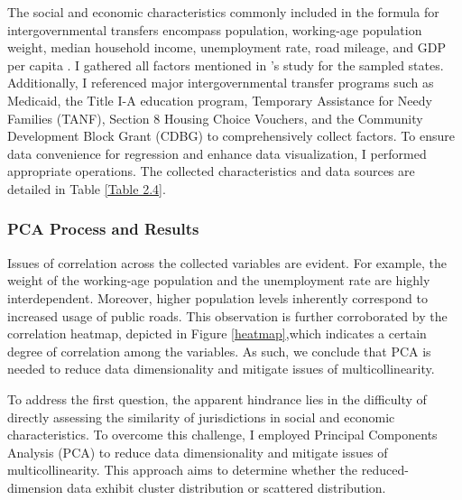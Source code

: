 The social and economic characteristics commonly included in the formula for intergovernmental transfers encompass population, working-age population weight, median household income, unemployment rate, road mileage, and GDP per capita \parencite{dilger2015federal}. I gathered all factors mentioned in \Textcite{dilger2015federal}'s study for the sampled states. Additionally, I referenced major intergovernmental transfer programs such as Medicaid, the Title I-A education program, Temporary Assistance for Needy Families (TANF), Section 8 Housing Choice Vouchers, and the Community Development Block Grant (CDBG) to comprehensively collect factors. To ensure data convenience for regression and enhance data visualization, I performed appropriate operations. The collected characteristics and data sources are detailed in Table \ref{Table 2.4}.%


\subsubsection{PCA Process and Results}

Issues of correlation across the collected variables are evident. For example, the weight of the working-age population and the unemployment rate are highly interdependent. Moreover, higher population levels inherently correspond to increased usage of public roads. This observation is further corroborated by the correlation heatmap, depicted in Figure \ref{heatmap},which indicates a certain degree of correlation among the variables. As such, we conclude that PCA is needed to reduce data dimensionality and mitigate issues of multicollinearity.%


To address the first question, the apparent hindrance lies in the difficulty of directly assessing the similarity of jurisdictions in social and economic characteristics. To overcome this challenge, I employed Principal Components Analysis (PCA) to reduce data dimensionality and mitigate issues of multicollinearity. This approach aims to determine whether the reduced-dimension data exhibit cluster distribution or scattered distribution.

